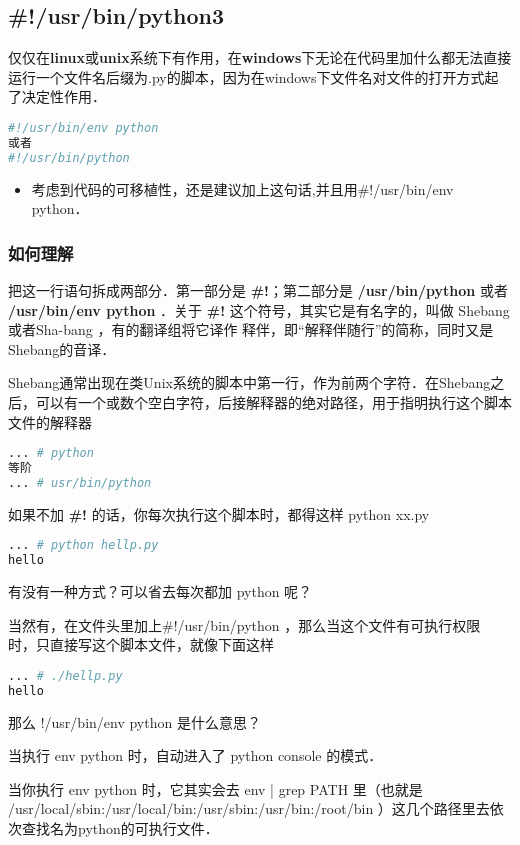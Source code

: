 \subsection{#!/usr/bin/python3 }
仅仅在\textbf{linux}或\textbf{unix}系统下有作用，在\textbf{windows}下无论在代码里加什么都无法直接运行一个文件名后缀为.py的脚本，因为在windows下文件名对文件的打开方式起了决定性作用．
\begin{lstlisting}[language=python]
#!/usr/bin/env python
或者
#!/usr/bin/python
\end{lstlisting}
\begin{itemize}
\item 考虑到代码的可移植性，还是建议加上这句话,并且用#!/usr/bin/env python．
\end{itemize}

\subsubsection{如何理解}
把这一行语句拆成两部分．第一部分是 \textbf{#!}；第二部分是 \textbf{/usr/bin/python} 或者 \textbf{/usr/bin/env python} ．关于 \textbf{#!} 这个符号，其实它是有名字的，叫做 Shebang 或者Sha-bang ，有的翻译组将它译作 释伴，即“解释伴随行”的简称，同时又是Shebang的音译．

Shebang通常出现在类Unix系统的脚本中第一行，作为前两个字符．在Shebang之后，可以有一个或数个空白字符，后接解释器的绝对路径，用于指明执行这个脚本文件的解释器
\begin{lstlisting}[language=bash]
... # python
等阶
... # usr/bin/python
\end{lstlisting}

如果不加 \textbf{#!} 的话，你每次执行这个脚本时，都得这样 python xx.py
\begin{lstlisting}[language=bash]
... # python hellp.py
hello
\end{lstlisting}

有没有一种方式？可以省去每次都加 python 呢？

当然有，在文件头里加上#!/usr/bin/python ，那么当这个文件有可执行权限 时，只直接写这个脚本文件，就像下面这样
\begin{lstlisting}[language=bash]
... # ./hellp.py
hello
\end{lstlisting}

那么 !/usr/bin/env python 是什么意思？

当执行 env python 时，自动进入了 python console 的模式．

当你执行 env python 时，它其实会去 env | grep PATH 里（也就是 /usr/local/sbin:/usr/local/bin:/usr/sbin:/usr/bin:/root/bin ）这几个路径里去依次查找名为python的可执行文件．

